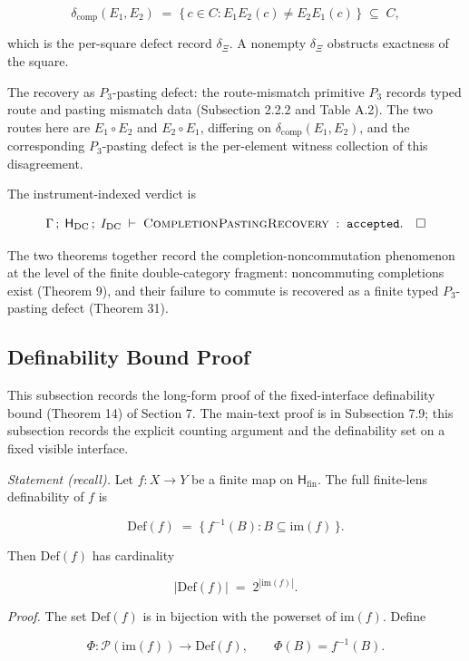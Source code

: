 \documentclass[11pt]{article}
\theoremstyle{definition}
\begin{document}
\[
\delta_{\mathrm{comp}}(E_{1},E_{2})\;=\;\{\,c\in C:E_{1}E_{2}(c)\neq E_{2}E_{1}(c)\,\}\;\subseteq\;C,
\]

which is the per-square defect record \(\delta_{\Xi}\). A nonempty \(\delta_{\Xi}\) obstructs exactness of the square.

The recovery as \(P_{3}\)-pasting defect: the route-mismatch primitive \(P_{3}\) records typed route and pasting mismatch data (Subsection 2.2.2 and Table A.2). The two routes here are \(E_{1}\circ E_{2}\) and \(E_{2}\circ E_{1}\), differing on \(\delta_{\mathrm{comp}}(E_{1},E_{2})\), and the corresponding \(P_{3}\)-pasting defect is the per-element witness collection of this disagreement.

The instrument-indexed verdict is

\[
\Gamma\,;\;\mathsf H_{\mathrm{DC}}\,;\;I_{\mathrm{DC}}\;\vdash\;\textsc{CompletionPastingRecovery}\;:\;\texttt{accepted}.\quad\square
\]

The two theorems together record the completion-noncommutation phenomenon at the level of the finite double-category fragment: noncommuting completions exist (Theorem 9), and their failure to commute is recovered as a finite typed \(P_{3}\)-pasting defect (Theorem 31).

\subsection{Definability Bound Proof}

This subsection records the long-form proof of the fixed-interface definability bound (Theorem 14) of Section 7. The main-text proof is in Subsection 7.9; this subsection records the explicit counting argument and the definability set on a fixed visible interface.

\emph{Statement (recall).} Let \(f:X\to Y\) be a finite map on \(\mathsf H_{\mathrm{fin}}\). The full finite-lens definability of \(f\) is

\[
\mathrm{Def}(f)\;=\;\{\,f^{-1}(B):B\subseteq\mathrm{im}(f)\,\}.
\]

Then \(\mathrm{Def}(f)\) has cardinality

\[
|\mathrm{Def}(f)|\;=\;2^{|\mathrm{im}(f)|}.
\]

\emph{Proof.} The set \(\mathrm{Def}(f)\) is in bijection with the powerset of \(\mathrm{im}(f)\). Define

\[
\Phi:\mathcal P(\mathrm{im}(f))\longrightarrow\mathrm{Def}(f),
\qquad
\Phi(B)=f^{-1}(B).
\]
\end{document}

